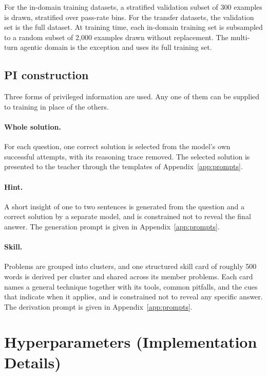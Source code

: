 \documentclass{article}
\begin{document}
For the in-domain training datasets, a stratified validation subset of 300
examples is drawn, stratified over pass-rate bins. For the transfer datasets, the
validation set is the full dataset. At training time, each in-domain training set
is subsampled to a random subset of 2{,}000 examples drawn without replacement.
The multi-turn agentic domain is the exception and uses its full training set.

\subsection{PI construction}
\label{app:sub:piconstruct}

Three forms of privileged information are used. Any one of them can be supplied to
training in place of the others.

\paragraph{Whole solution.} For each question, one correct solution is selected
from the model's own successful attempts, with its reasoning trace removed. The
selected solution is presented to the teacher through the templates of
Appendix~\ref{app:prompts}.

\paragraph{Hint.} A short insight of one to two sentences is generated from the
question and a correct solution by a separate model, and is constrained not to
reveal the final answer. The generation prompt is given in
Appendix~\ref{app:prompts}.

\paragraph{Skill.} Problems are grouped into clusters, and one structured skill
card of roughly 500 words is derived per cluster and shared across its
member problems. Each card names a general technique together with its tools,
common pitfalls, and the cues that indicate when it applies, and is constrained
not to reveal any specific answer. The derivation prompt is given in
Appendix~\ref{app:prompts}.

\section{Hyperparameters (Implementation Details)}
\label{app:hyper}
\end{document}
